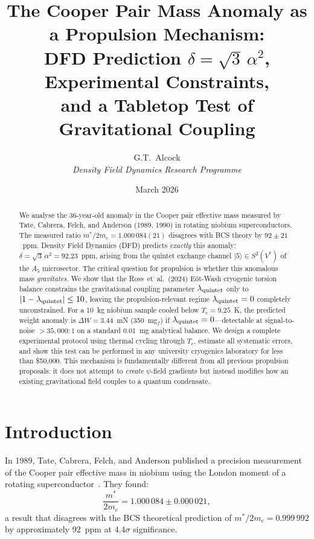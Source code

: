 \documentclass[12pt,a4paper]{article}
\title{The Cooper Pair Mass Anomaly as a Propulsion Mechanism:\\
\large DFD Prediction $\delta = \sqrt{3}\,\alpha^2$, Experimental Constraints,\\
and a Tabletop Test of Gravitational Coupling}
\author{G.T.\ Alcock\\
\textit{Density Field Dynamics Research Programme}}
\date{March 2026}
\theoremstyle{definition}
\theoremstyle{remark}
\begin{document}
\maketitle

\begin{abstract}
We analyse the 36-year-old anomaly in the Cooper pair effective mass measured by
Tate, Cabrera, Felch, and Anderson (1989, 1990) in rotating niobium superconductors.
The measured ratio $m^*/2m_e = 1.000\,084(21)$ disagrees with BCS theory by
$92 \pm 21$~ppm.  Density Field Dynamics (DFD) predicts \emph{exactly} this anomaly:
$\delta = \sqrt{3}\,\alpha^2 = 92.23$~ppm, arising from the quintet exchange channel
$|5\rangle \in S^2(V^*)$ of the $A_5$ microsector.  The critical question for propulsion
is whether this anomalous mass \emph{gravitates}.  We show that the Ross~et~al.\ (2024)
E\"ot-Wash cryogenic torsion balance constrains the gravitational coupling parameter
$\lambda_{\rm quintet}$ only to $|1 - \lambda_{\rm quintet}| \leq 10$, leaving the
propulsion-relevant regime $\lambda_{\rm quintet} = 0$ completely unconstrained.  For a
10~kg niobium sample cooled below $T_c = 9.25$~K, the predicted weight anomaly is
$\Delta W = 3.44$~mN (350~mg$_f$) if $\lambda_{\rm quintet} = 0$---detectable at
signal-to-noise $> 35{,}000\!:\!1$ on a standard 0.01~mg analytical balance.  We design
a complete experimental protocol using thermal cycling through $T_c$, estimate all
systematic errors, and show this test can be performed in any university cryogenics
laboratory for less than \$50{,}000.  This mechanism is fundamentally different from all
previous propulsion proposals: it does not attempt to \emph{create} $\psi$-field gradients
but instead modifies how an existing gravitational field couples to a quantum condensate.
\end{abstract}

\tableofcontents

\section{Introduction}\label{sec:intro}

In 1989, Tate, Cabrera, Felch, and Anderson published a precision measurement of
the Cooper pair effective mass in niobium using the London moment of a rotating
superconductor~\cite{Tate1989,Tate1990}.  They found:
\begin{equation}\label{eq:tate}
\frac{m^*}{2m_e} = 1.000\,084 \pm 0.000\,021,
\end{equation}
a result that disagrees with the BCS theoretical prediction of $m^*/2m_e = 0.999\,992$
by approximately 92~ppm at $4.4\sigma$ significance.
\end{document}
